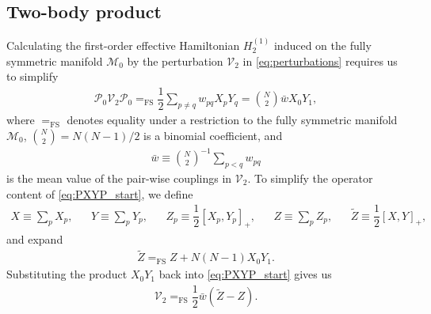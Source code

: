 \documentclass[nofootinbib,notitlepage,11pt]{revtex4-2}
\newcommand{\f}[2]{\dfrac{#1}{#2}} %
\newcommand{\p}[1]{\left(#1\right)} %
\renewcommand{\sp}[1]{\left[#1\right]} %
\newcommand{\1}{\mathds{1}}
\newcommand{\M}{\mathcal{M}}
\renewcommand{\P}{\mathcal{P}}
\newcommand{\V}{\mathcal{V}}
\newcommand{\FSEQ}{=_{\text{FS}}}
\begin{document}
\subsection{Two-body product}
\label{sec:PXYP}

Calculating the first-order effective Hamiltonian $H_2^{(1)}$ induced
on the fully symmetric manifold $\M_0$ by the perturbation $\V_2$ in
\eqref{eq:perturbations} requires us to simplify
\begin{align}
  \P_0 \V_2 \P_0
  \FSEQ \f12 \sum_{p\ne q} w_{pq} X_p Y_q
  = {N\choose 2} \bar w X_0 Y_1,
  \label{eq:PXYP_start}
\end{align}
where $\FSEQ$ denotes equality under a restriction to the fully
symmetric manifold $\M_0$, ${N\choose2}=N\p{N-1}/2$ is a binomial
coefficient, and
\begin{align}
  \bar w \equiv {N\choose 2}^{-1} \sum_{p<q} w_{pq}
\end{align}
is the mean value of the pair-wise couplings in $\V_2$.  To simplify
the operator content of \eqref{eq:PXYP_start}, we define
\begin{align}
  X \equiv \sum_p X_p,
  &&
  Y \equiv \sum_p Y_p,
  &&
  Z_p \equiv \f12\sp{X_p, Y_p}_+,
  &&
  Z \equiv \sum_p Z_p,
  &&
  \tilde Z \equiv \f12 \sp{X, Y}_+,
\end{align}
and expand
\begin{align}
  \tilde Z \FSEQ Z + N\p{N-1} X_0 Y_1.
\end{align}
Substituting the product $X_0 Y_1$ back into \eqref{eq:PXYP_start}
gives us
\begin{align}
  \V_2 \FSEQ \f12 \bar w \p{\tilde Z -  Z }.
\end{align}


\end{document}
